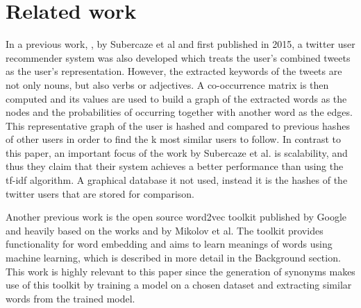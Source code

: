 \section{Related work}
\label{sec:relwork}
In a previous work, \cite{userRec},  by Subercaze et al and first published in 2015, a twitter user recommender system was also developed which treats the user’s combined tweets as the user’s representation. However, the extracted keywords of the tweets are not only nouns, but also verbs or adjectives. A co-occurrence matrix is then computed and its values are used to build a graph of the extracted words as the nodes and the probabilities of occurring together with another word as the edges. This representative graph of the user is hashed and compared to previous hashes of other users in order to find the k most similar users to follow. In contrast to this paper, an important focus of the work by Subercaze et al. is scalability, and thus they claim that their system achieves a better performance than using the tf-idf algorithm. A graphical database it not used, instead it is the hashes of the twitter users that are stored for comparison.

Another previous work is the open source word2vec toolkit published by Google and heavily based on the works \cite{wordRep} and \cite{disRep} by Mikolov et al. The toolkit provides functionality for word embedding and aims to learn meanings of words using machine learning, which is described in more detail in the Background section. This work is highly relevant to this paper since the generation of synonyms makes use of this toolkit by training a model on a chosen dataset and extracting similar words from the trained model.


